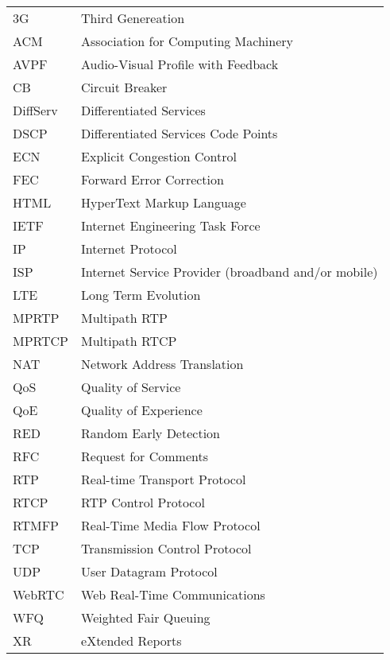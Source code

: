 \begin{longtable}{ll}
3G		& Third Genereation \\
ACM 	& Association for Computing Machinery \\
AVPF	& Audio-Visual Profile with Feedback \\
CB		& Circuit Breaker \\
DiffServ	& Differentiated Services \\
DSCP 	& Differentiated Services Code Points \\
ECN		& Explicit Congestion Control \\
FEC		& Forward Error Correction \\
HTML	& HyperText Markup Language \\
IETF	& Internet Engineering Task Force \\
IP		& Internet Protocol \\
ISP 	& Internet Service Provider (broadband and/or mobile)\\
LTE 	& Long Term Evolution \\
MPRTP 	& Multipath RTP \\
MPRTCP	& Multipath RTCP \\
NAT 	& Network Address Translation \\
QoS 	& Quality of Service \\
QoE 	& Quality of Experience \\
RED 	& Random Early Detection \\
RFC 	& Request for Comments \\
RTP 	& Real-time Transport Protocol \\
RTCP 	& RTP Control Protocol \\
RTMFP	& Real-Time Media Flow Protocol \\
TCP 	& Transmission Control Protocol \\
UDP 	& User Datagram Protocol \\
WebRTC	& Web Real-Time Communications \\
WFQ 	& Weighted Fair Queuing \\
XR		& eXtended Reports \\
\end{longtable}
